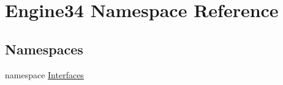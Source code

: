 \hypertarget{a00257}{}\section{Engine34 Namespace Reference}
\label{a00257}
\subsection*{Namespaces}
\begin{DoxyCompactItemize}
\item 
namespace \hyperlink{a00258}{Interfaces}
\end{DoxyCompactItemize}
